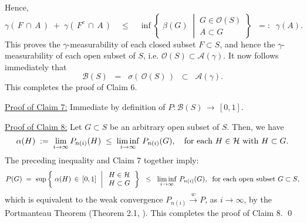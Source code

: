 Hence,
\begin{equation*}
\gamma(\,F\,\cap\,A\,) \;+\; \gamma(\,F^{c}\,\cap\,A\,)
\quad\leq\quad
\inf\left\{\;
\beta(G)
\;\;\left\vert\,
\begin{array}{c} G \in \mathcal{O}(S) \\ A \subset G \end{array}
\right.
\right\}
\;\; =: \;\; \gamma(A).
\end{equation*}
This proves the $\gamma$-measurability of each closed subset $F \subset S$,
and hence the $\gamma$-measurability of each open subset of $S$,
i.e. $\mathcal{O}(S) \subset \mathcal{A}(\gamma)$.
It now follows immediately that
\begin{equation*}
\mathcal{B}(S)
\;\; = \;\; \sigma\!\left(\,\mathcal{O}(S)\,\right)
\;\; \subset \;\; \mathcal{A}(\gamma).
\end{equation*}
This completes the proof of Claim 6.

\vskip 0.5cm
\noindent
\underline{Proof of Claim 7:}\quad
Immediate by definition of $P : \mathcal{B}(S) \,\longrightarrow\, [0,1]$.

\vskip 0.5cm
\noindent
\underline{Proof of Claim 8:}\quad
Let $G \subset S$ be an arbitrary open subset of $S$.
Then, we have
\begin{equation*}
\alpha(H)
\; := \; \lim_{i\rightarrow\infty}P_{n(i)}(H)
\;\leq\; \liminf_{i\rightarrow\infty}\,P_{n(i)}(G),
\quad
\textnormal{for each $H \in \mathcal{H}$ with $H \subset G$}.
\end{equation*}
The preceding inequality and Claim 7 together imply:
\begin{equation*}
P(G)
\; = \;
\sup\left\{\;
\alpha(H) \,\in\, [0,1]
\,\;\left\vert\;
\begin{array}{l} H \in \mathcal{H} \\ H \subset G \end{array}
\right.
\right\}
\;\;\leq\;\;
\liminf_{i\rightarrow\infty}\,P_{n(i)}(G),
\;\;
\textnormal{for each open subset $G \subset S$},
\end{equation*}
which is equivalent to the weak convergence
$P_{n(i)} \overset{w}{\longrightarrow} P$, as $i \longrightarrow \infty$,
by the Portmanteau Theorem (Theorem 2.1, \cite{Billingsley1999}).
This completes the proof of Claim 8.
\qed

\renewcommand{\theenumi}{\roman{enumi}}
\renewcommand{\labelenumi}{\textnormal{(\theenumi)}$\;\;$}

